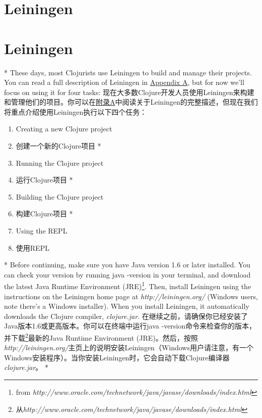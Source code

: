 \begin{paracol}{2}
\section{Leiningen}
\switchcolumn
\section{Leiningen}
\switchcolumn[0]*
These days, most Clojurists use Leiningen to build and manage their
projects. You can read a full description of Leiningen in
\href{javascript:void(0)}{Appendix A}, but for now we'll focus on using
it for four tasks:
\switchcolumn
现在大多数Clojure开发人员使用Leiningen来构建和管理他们的项目。你可以在\href{javascript:void(0)}{附录A}中阅读关于Leiningen的完整描述，但现在我们将重点介绍使用Leiningen执行以下四个任务：
\begin{enumerate}
\switchcolumn[0]*
\item  Creating a new Clojure project
\switchcolumn
\item  创建一个新的Clojure项目
\switchcolumn[0]*
\item  Running the Clojure project
\switchcolumn
\item  运行Clojure项目
\switchcolumn[0]*
\item  Building the Clojure project
\switchcolumn
\item  构建Clojure项目
\switchcolumn[0]*
\item  Using the REPL
\switchcolumn
\item  使用REPL
\end{enumerate}

\switchcolumn[0]*
Before continuing, make sure you have Java version 1.6 or later
installed. You can check your version by running java -version in your
terminal, and download the latest Java Runtime Environment (JRE)\footnote{from
\emph{http://www.oracle.com/technetwork/java/javase/downloads/index.html}}.
Then, install Leiningen using the instructions on the Leiningen home
page at \emph{http://leiningen.org/} (Windows users, note there's a
Windows installer). When you install Leiningen, it automatically
downloads the Clojure compiler, \emph{clojure.jar}.
\switchcolumn
在继续之前，请确保你已经安装了Java版本1.6或更高版本。你可以在终端中运行java -version命令来检查你的版本，并下载\footnote{从\emph{http://www.oracle.com/technetwork/java/javase/downloads/index.html}}最新的Java Runtime Environment (JRE)。然后，按照\emph{http://leiningen.org/}主页上的说明安装Leiningen（Windows用户请注意，有一个Windows安装程序）。当你安装Leiningen时，它会自动下载Clojure编译器\emph{clojure.jar}。
\switchcolumn[0]*

\end{paracol}
